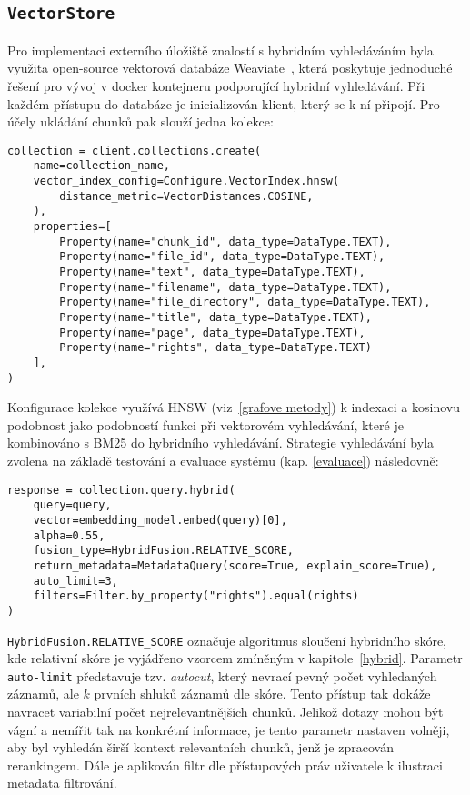 \subsection{\texttt{VectorStore}}
Pro implementaci externího úložiště znalostí s hybridním vyhledáváním byla využita open-source vektorová databáze Weaviate~\cite{weaviate}, která poskytuje jednoduché řešení pro vývoj v docker kontejneru podporující hybridní vyhledávání. Při každém přístupu do databáze je inicializován klient, který se k ní připojí. Pro účely ukládání chunků pak slouží jedna kolekce:
\begin{verbatim}
collection = client.collections.create(
    name=collection_name,
    vector_index_config=Configure.VectorIndex.hnsw(
        distance_metric=VectorDistances.COSINE,
    ),
    properties=[
        Property(name="chunk_id", data_type=DataType.TEXT),
        Property(name="file_id", data_type=DataType.TEXT),
        Property(name="text", data_type=DataType.TEXT),
        Property(name="filename", data_type=DataType.TEXT),
        Property(name="file_directory", data_type=DataType.TEXT),
        Property(name="title", data_type=DataType.TEXT),
        Property(name="page", data_type=DataType.TEXT),
        Property(name="rights", data_type=DataType.TEXT)
    ],
)
\end{verbatim}
Konfigurace kolekce využívá HNSW (viz~\ref{grafove metody}) k indexaci a kosinovu podobnost jako podobností funkci při vektorovém vyhledávání, které je kombinováno s BM25 do hybridního vyhledávání. Strategie vyhledávání byla zvolena na základě testování a evaluace systému (kap. \ref{evaluace}) následovně:
\begin{verbatim}
response = collection.query.hybrid(
    query=query,
    vector=embedding_model.embed(query)[0],
    alpha=0.55,
    fusion_type=HybridFusion.RELATIVE_SCORE,
    return_metadata=MetadataQuery(score=True, explain_score=True),
    auto_limit=3,
    filters=Filter.by_property("rights").equal(rights)
)
\end{verbatim}
\texttt{HybridFusion.RELATIVE\_SCORE} označuje algoritmus sloučení hybridního skóre, kde relativní skóre je vyjádřeno vzorcem zmíněným v kapitole~\ref{hybrid}. Parametr \texttt{auto-limit} představuje tzv. \textit{autocut}, který nevrací pevný počet vyhledaných záznamů, ale $k$ prvních shluků záznamů dle skóre. Tento přístup tak dokáže navracet variabilní počet nejrelevantnějších chunků. Jelikož dotazy mohou být vágní a nemířit tak na konkrétní informace, je tento parametr nastaven volněji, aby byl vyhledán širší kontext relevantních chunků, jenž je zpracován rerankingem. Dále je aplikován filtr dle přístupových práv uživatele k ilustraci metadata filtrování.


